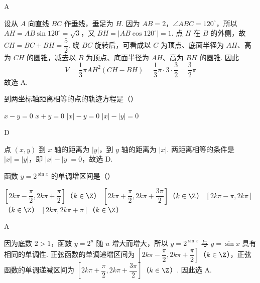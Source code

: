 \begin{answer}
A
\end{answer}

\begin{solution}
设从 \(A\) 向直线 \(BC\) 作垂线，垂足为 \(H\). 因为 \(AB=2\)，\(\angle ABC=120^{\circ}\)，所以 \(AH=AB\sin120^{\circ}=\sqrt{3}\)，又 \(BH=\lvert AB\cos120^{\circ}\rvert=1\).
点 \(H\) 在 \(B\) 的外侧，故 \(CH=BC+BH=\dfrac{5}{2}\). 绕 \(BC\) 旋转后，可看成以 \(C\) 为顶点、底面半径为 \(AH\)、高为 \(CH\) 的圆锥，减去以 \(B\) 为顶点、底面半径为 \(AH\)、高为 \(BH\) 的圆锥. 因此
\[
V=\dfrac{1}{3}\pi AH^{2}(CH-BH)=\dfrac{1}{3}\pi\cdot3\cdot\dfrac{3}{2}=\dfrac{3}{2}\pi
\]
故选 A.
\end{solution}

\begin{problem}
到两坐标轴距离相等的点的轨迹方程是（\quad）

\choices
    {\(x-y=0\)}
    {\(x+y=0\)}
    {\(\lvert x\rvert-y=0\)}
    {\(\lvert x\rvert-\lvert y\rvert=0\)}
\end{problem}

\begin{answer}
D
\end{answer}

\begin{solution}
点 \((x,y)\) 到 \(x\) 轴的距离为 \(\lvert y\rvert\)，到 \(y\) 轴的距离为 \(\lvert x\rvert\). 两距离相等的条件是 \(\lvert x\rvert=\lvert y\rvert\)，即 \(\lvert x\rvert-\lvert y\rvert=0\)，故选 D.
\end{solution}

\begin{problem}
函数 \(y=2^{\sin x}\) 的单调增区间是（\quad）

\choices
    {\(\left[2k\pi-\dfrac{\pi}{2},2k\pi+\dfrac{\pi}{2}\right]\)（\(k\in\Z\)）}
    {\(\left[2k\pi+\dfrac{\pi}{2},2k\pi+\dfrac{3\pi}{2}\right]\)（\(k\in\Z\)）}
    {\([2k\pi-\pi,2k\pi]\)（\(k\in\Z\)）}
    {\([2k\pi,2k\pi+\pi]\)（\(k\in\Z\)）}
\end{problem}

\begin{answer}
A
\end{answer}

\begin{solution}
因为底数 \(2>1\)，函数 \(y=2^{u}\) 随 \(u\) 增大而增大，所以 \(y=2^{\sin x}\) 与 \(y=\sin x\) 具有相同的单调性. 正弦函数的单调递增区间为
\(\left[2k\pi-\dfrac{\pi}{2},2k\pi+\dfrac{\pi}{2}\right]\)（\(k\in\Z\)），正弦函数的单调递减区间为
\(\left[2k\pi+\dfrac{\pi}{2},2k\pi+\dfrac{3\pi}{2}\right]\)（\(k\in\Z\)）. 因此选 A.
\end{solution}

